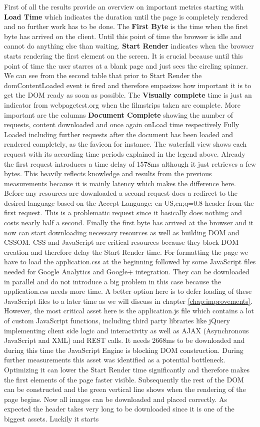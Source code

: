First of all the results provide an overview on important metrics starting with \textbf{Load Time} which indicates the duration until the page is completely rendered and no further work has to be done. The \textbf{First Byte} is the time when the first byte has arrived on the client. Until this point of time the browser is idle and cannot do anything else than waiting. \textbf{Start Render} indicates when the browser starts rendering the first element on the screen. It is crucial because until this point of time the user starres at a blank page and just sees the circling spinner. We can see from the second table that prior to Start Render the domContentLoaded event is fired and therefore empasizes how important it is to get the DOM ready as soon as possible. The \textbf{Visually complete} time is just an indicator from webpagetest.org when the filmstrips taken are complete. More important are the columns \textbf{Document Complete} showing the number of requests, content downloaded and once again onLoad time respectively Fully Loaded including further requests after the document has been loaded and rendered completely, as the favicon for instance. The waterfall view shows each request with its according time periods explained in the legend above. Already the first request introduces a time delay of 1578ms although it just retrieves a few bytes. This heavily reflects knowledge and results from the previous measurements because it is mainly latency which makes the difference here. Before any resources are downloaded a second request does a redirect to the desired language based on the Accept-Language: en-US,en;q=0.8 header from the first request. This is a problematic request since it basically does nothing and costs nearly half a second. Finally the first byte has arrived at the browser and it now can start downloading necessary resources as well as building DOM and CSSOM. CSS and JavaScript are critical resources because they block DOM creation and therefore delay the Start Render time. For formatting the page we have to load the application.css at the beginning followed by some JavaScript files needed for Google Analytics and Google+ integration. They can be downloaded in parallel and do not introduce a big problem in this case because the application.css needs more time. A better option here is to defer loading of these JavaScript files to a later time as we will discuss in chapter \ref{chap:improvements}. However, the most critical asset here is the application.js file which contains a lot of custom JavaScript functions, including third party libraries like jQuery implementing client side logic and interactivity as well as AJAX (Asynchronous JavaScript and XML) and REST calls. It needs 2668ms to be downloaded and during this time the JavaScript Engine is blocking DOM construction. During further measurements this asset was identified as a potential bottleneck. Optimizing it can lower the Start Render time significantly and therefore makes the first elements of the page faster visible. Subsequently the rest of the DOM can be constructed and the green vertical line shows when the rendering of the page begins. Now all images can be downloaded and placed correctly. As expected the header takes very long to be downloaded since it is one of the biggest assets. Luckily it starts 